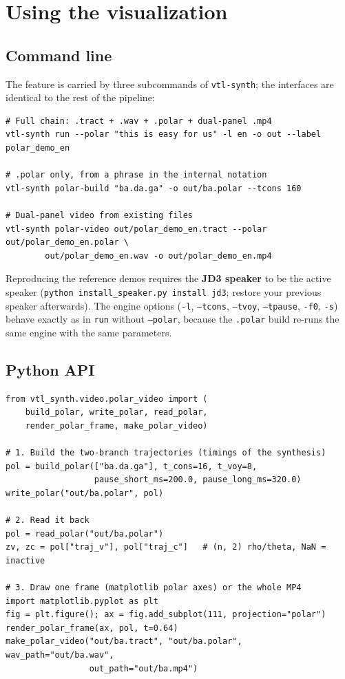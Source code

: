 \documentclass[11pt,a4paper]{article}
\newcommand{\code}[1]{\texttt{#1}}
\begin{document}
\section{Using the visualization}

\subsection{Command line}

The feature is carried by three subcommands of \code{vtl-synth}; the
interfaces are identical to the rest of the pipeline:

\begin{lstlisting}[style=shell]
# Full chain: .tract + .wav + .polar + dual-panel .mp4
vtl-synth run --polar "this is easy for us" -l en -o out --label polar_demo_en

# .polar only, from a phrase in the internal notation
vtl-synth polar-build "ba.da.ga" -o out/ba.polar --tcons 160

# Dual-panel video from existing files
vtl-synth polar-video out/polar_demo_en.tract --polar out/polar_demo_en.polar \
        out/polar_demo_en.wav -o out/polar_demo_en.mp4
\end{lstlisting}

Reproducing the reference demos requires the \textbf{JD3 speaker} to
be the active speaker (\code{python install\_speaker.py install jd3};
restore your previous speaker afterwards). The engine options
(\code{-l}, \code{--tcons}, \code{--tvoy}, \code{--tpause},
\code{-f0}, \code{-s}) behave exactly as in \code{run} without
\code{--polar}, because the \code{.polar} build re-runs the same
engine with the same parameters.

\subsection{Python API}

\begin{lstlisting}[style=python]
from vtl_synth.video.polar_video import (
    build_polar, write_polar, read_polar,
    render_polar_frame, make_polar_video)

# 1. Build the two-branch trajectories (timings of the synthesis)
pol = build_polar(["ba.da.ga"], t_cons=16, t_voy=8,
                  pause_short_ms=200.0, pause_long_ms=320.0)
write_polar("out/ba.polar", pol)

# 2. Read it back
pol = read_polar("out/ba.polar")
zv, zc = pol["traj_v"], pol["traj_c"]   # (n, 2) rho/theta, NaN = inactive

# 3. Draw one frame (matplotlib polar axes) or the whole MP4
import matplotlib.pyplot as plt
fig = plt.figure(); ax = fig.add_subplot(111, projection="polar")
render_polar_frame(ax, pol, t=0.64)
make_polar_video("out/ba.tract", "out/ba.polar", wav_path="out/ba.wav",
                 out_path="out/ba.mp4")
\end{lstlisting}
\end{document}
